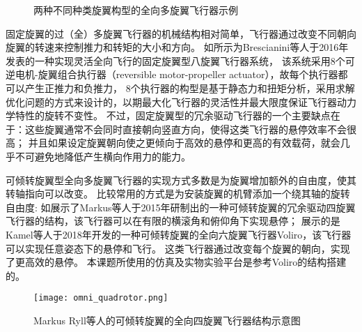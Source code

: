 \begin{figure}[!ht]
    \setlength{\subfigcapskip}{-1bp}
    \centering
    \begin{minipage}{\textwidth}

    \centering
    \subfigure{\label{fig:omav_1}}\addtocounter{subfigure}{-2}
    \hspace{0.2em}
    \subfigure{\label{fig:omav_2}}\addtocounter{subfigure}{-2}
    
    \end{minipage}
    \caption{两种不同种类旋翼构型的全向多旋翼飞行器示例\label{fig:omav}}
\end{figure}

固定旋翼的过（全）多旋翼飞行器的机械结构相对简单，飞行器通过改变不同朝向旋翼的转速来控制推力和转矩的大小和方向。
如所示为Brescianini等人于2016年发表的一种实现灵活全向飞行的固定旋翼型八旋翼飞行器系统\cite{brescianini2016design}，
该系统采用8个可逆电机-旋翼组合执行器（reversible motor-propeller actuator），故每个执行器都可以产生正推力和负推力，
8个执行器的构型是基于静态力和扭矩分析，采用求解优化问题的方式来设计的，以期最大化飞行器的灵活性并最大限度保证飞行器动力学特性的旋转不变性。
不过，固定旋翼型的冗余驱动飞行器的一个主要缺点在于：这些旋翼通常不会同时直接朝向竖直方向，使得这类飞行器的悬停效率不会很高；
并且如果设定旋翼朝向使之更倾向于高效的悬停和更高的有效载荷，就会几乎不可避免地降低产生横向作用力的能力\cite{allenspach2020design}。

可倾转旋翼型全向多旋翼飞行器的实现方式多数是为旋翼增加额外的自由度，使其转轴指向可以改变。
比较常用的方式是为安装旋翼的机臂添加一个绕其轴的旋转自由度:
如展示了Markus等人于2015年研制出的一种可倾转旋翼的冗余驱动四旋翼飞行器的结构\cite{ryll2014novel}，该飞行器可以在有限的横滚角和俯仰角下实现悬停；
展示的是Kamel等人于2018年开发的一种可倾转旋翼的全向六旋翼飞行器Voliro\cite{kamel2018voliro}，该飞行器可以实现任意姿态下的悬停和飞行。
这类飞行器通过改变每个旋翼的朝向，实现了更高效的悬停。
本课题所使用的仿真及实物实验平台是参考Voliro的结构搭建的。

\begin{figure}[ht]
    \centering
    \texttt{[image: omni\_quadrotor.png]}
    \caption{Markus Ryll等人的可倾转旋翼的全向四旋翼飞行器结构示意图}
    \label{fig:tiltrotor_quadrotor}
\end{figure}

